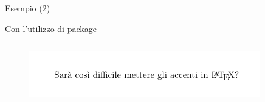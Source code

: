 \begin{frame}[fragile]{Esempio (2)}

\begin{esempio}{Con l'utilizzo di package}
    \begin{code}
        	\inputminted[linenos] {latex}{res/examples/withutf8.tex}
    \end{code}
    
	\begin{figure}
        \centering
        \includegraphics[scale=0.9]{res/images/w_utf8}
    \end{figure}
    \vspace{1mm}
\end{esempio}

\end{frame}
